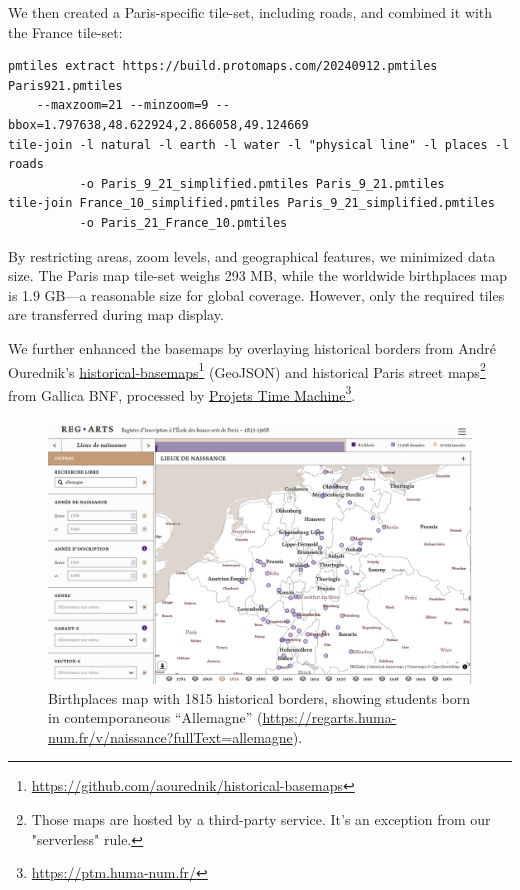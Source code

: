 \documentclass[final]{anthology-ch} %
\begin{document}
We then created a Paris-specific tile-set, including roads, and combined it with the France tile-set:
\begin{verbatim}
pmtiles extract https://build.protomaps.com/20240912.pmtiles Paris921.pmtiles
    --maxzoom=21 --minzoom=9 --bbox=1.797638,48.622924,2.866058,49.124669
tile-join -l natural -l earth -l water -l "physical line" -l places -l roads
          -o Paris_9_21_simplified.pmtiles Paris_9_21.pmtiles
tile-join France_10_simplified.pmtiles Paris_9_21_simplified.pmtiles
          -o Paris_21_France_10.pmtiles
\end{verbatim}
By restricting areas, zoom levels, and geographical features, we minimized data size. The Paris map tile-set weighs 293 MB, while the worldwide birthplaces map is 1.9 GB—a reasonable size for global coverage. However, only the required tiles are transferred during map display.

We further enhanced the basemaps by overlaying historical borders from André Ourednik’s \href{https://github.com/aourednik/historical-basemaps}{historical-basemaps}\footnote{\href{https://github.com/aourednik/historical-basemaps}{https://github.com/aourednik/historical-basemaps}} (GeoJSON) and historical Paris street maps\footnote{Those maps are hosted by a third-party service. It's an exception from our "serverless" rule.} from Gallica BNF, processed by \href{https://ptm.huma-num.fr/}{Projets Time Machine}\footnote{\url{https://ptm.huma-num.fr/}}.



\begin{figure}[t!]
  \centering
  \includegraphics[width=1\linewidth]{figures/brithplaces_map.png}
  \caption{Birthplaces map with 1815 historical borders, showing students born in contemporaneous “Allemagne” (\href{https://regarts.huma-num.fr/v/naissance?fullText=allemagne}{https://regarts.huma-num.fr/v/naissance?fullText=allemagne}).}
  \label{fig:birthplaces_map}
\end{figure}
\end{document}
